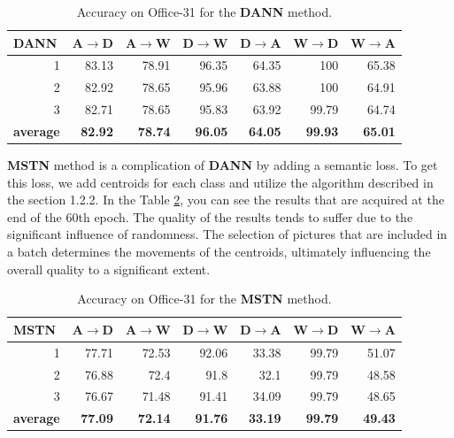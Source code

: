 \begin{table}[h]
\centering
\caption{Accuracy on Office-31 for the \textbf{DANN} method.}
\label{tab:dann}
\begin{tabular}{|r|r|r|r|r|r|r|}
\hline
\multicolumn{1}{|l|}{DANN} & \multicolumn{1}{l|}{A$\rightarrow$D} & \multicolumn{1}{l|}{A$\rightarrow$W} & \multicolumn{1}{l|}{D$\rightarrow$W} & \multicolumn{1}{l|}{D$\rightarrow$A} & \multicolumn{1}{l|}{W$\rightarrow$D} & \multicolumn{1}{l|}{W$\rightarrow$A} \\ \hline
1 & 83.13 & 78.91 & 96.35 & 64.35 & 100 & 65.38 \\ \hline
2 & 82.92 & 78.65 & 95.96 & 63.88 & 100 & 64.91 \\ \hline
3 & 82.71 & 78.65 & 95.83 & 63.92 & 99.79 & 64.74 \\ \hline
\multicolumn{1}{|l|}{\textbf{average}} & \textbf{82.92} & \textbf{78.74} & \textbf{96.05} & \textbf{64.05} & \textbf{99.93} & \textbf{65.01} \\ \hline
\end{tabular}
\end{table}

\textbf{MSTN} method is a complication of \textbf{DANN} by adding a semantic loss. To get this loss, we add centroids for each class and utilize the algorithm described in the section 1.2.2. In the Table \ref{tab:mstn}, you can see the results that are acquired at the end of the 60th epoch. The quality of the results tends to suffer due to the significant influence of randomness.  The selection of pictures that are included in a batch determines the movements of the centroids, ultimately influencing the overall quality to a significant extent.

\begin{table}[h]
\centering
\caption{Accuracy on Office-31 for the \textbf{MSTN} method.}
\label{tab:mstn}
\begin{tabular}{|r|r|r|r|r|r|r|}
\hline
\multicolumn{1}{|l|}{MSTN} & \multicolumn{1}{l|}{A$\rightarrow$D} & \multicolumn{1}{l|}{A$\rightarrow$W} & \multicolumn{1}{l|}{D$\rightarrow$W} & \multicolumn{1}{l|}{D$\rightarrow$A} & \multicolumn{1}{l|}{W$\rightarrow$D} & \multicolumn{1}{l|}{W$\rightarrow$A} \\ \hline
1 & 77.71 & 72.53 & 92.06 & 33.38 & 99.79 & 51.07 \\ \hline
2 & 76.88 & 72.4 & 91.8 & 32.1 & 99.79 & 48.58 \\ \hline
3 & 76.67 & 71.48 & 91.41 & 34.09 & 99.79 & 48.65 \\ \hline
\multicolumn{1}{|l|}{\textbf{average}} & \textbf{77.09} & \textbf{72.14} & \textbf{91.76} & \textbf{33.19} & \textbf{99.79} & \textbf{49.43} \\ \hline
\end{tabular}
\end{table}

